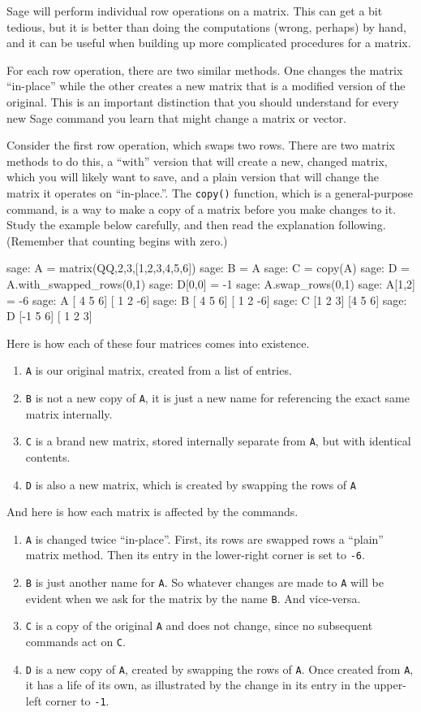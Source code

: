 Sage will perform individual row operations on a matrix.  This can get a bit tedious, but it is better than doing the computations (wrong, perhaps) by hand, and it can be useful when building up more complicated procedures for a matrix.
\par
%
For each row operation, there are two similar methods.  One changes the matrix ``in-place'' while the other creates a new matrix that is a modified version of the original.  This is an important distinction that you should understand for every new Sage command you learn that might change a matrix or vector.
\par
%
Consider the first row operation, which swaps two rows.  There are two matrix methods to do this, a ``with'' version that will create a new, changed matrix, which you will likely want to save, and a plain version that will change the matrix it operates on ``in-place.''.  The \verb?copy()? function, which is a general-purpose command, is a way to make a copy of a matrix before you make changes to it.  Study the example below carefully, and then read the explanation following. (Remember that counting begins with zero.)
%
\begin{sageexample}
sage: A = matrix(QQ,2,3,[1,2,3,4,5,6])
sage: B = A
sage: C = copy(A)
sage: D = A.with_swapped_rows(0,1)
sage: D[0,0] = -1
sage: A.swap_rows(0,1)
sage: A[1,2] = -6
sage: A
[ 4  5  6]
[ 1  2 -6]
sage: B
[ 4  5  6]
[ 1  2 -6]
sage: C
[1 2 3]
[4 5 6]
sage: D
[-1  5  6]
[ 1  2  3]
\end{sageexample}
%
Here is how each of these four matrices comes into existence.
\begin{enumerate}
\item \verb?A? is our original matrix, created from a list of entries.
\item \verb?B? is not a new copy of \verb?A?, it is just a new name for referencing the exact same matrix internally.
\item \verb?C? is a brand new matrix, stored internally separate from \verb?A?, but with identical contents.
\item \verb?D? is also a new matrix, which is created by swapping the rows of \verb?A?
\end{enumerate}
%
And here is how each matrix is affected by the commands.
%
\begin{enumerate}
\item \verb?A? is changed twice ``in-place''.  First, its rows are swapped rows a ``plain'' matrix method.  Then its entry in the lower-right corner is set to \verb?-6?.
\item \verb?B? is just another name for \verb?A?.  So whatever changes are made to \verb?A? will be evident when we ask for the matrix by the name \verb?B?.  And vice-versa.
\item \verb?C? is a copy of the original \verb?A? and does not change, since no subsequent commands act on \verb?C?.
\item \verb?D? is a new copy of \verb?A?, created by swapping the rows of \verb?A?.  Once created from \verb?A?, it has a life of its own, as illustrated by the change in its entry in the upper-left corner to \verb?-1?.
\end{enumerate}
